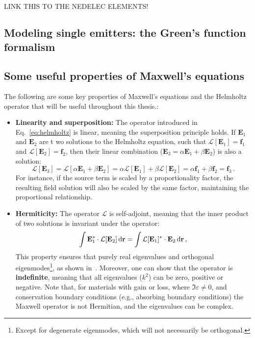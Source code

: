  LINK THIS TO THE NEDELEC ELEMENTS!

\subsection*{Modeling single emitters: the Green's function formalism}

\subsection*{Some useful properties of Maxwell's equations}
The following are some key properties of Maxwell's equations and the Helmholtz operator that will be useful throughout this thesis.:
\begin{itemize}
    \item \textbf{Linearity and superposition:} The operator introduced in Eq.~\eqref{eq:helmholtz} is linear, meaning the superposition principle holds. If $\mathbf{E}_1$ and $\mathbf{E}_2$ are t
    wo solutions to the Helmholtz equation, such that $\mathcal{L}[\mathbf{E}_1] = \mathbf{f}_1$ and 
    $\mathcal{L}[\mathbf{E}_2] = \mathbf{f}_2$, then their linear combination ($\mathbf{E}_3 = \alpha \mathbf{E}_1 + \beta \mathbf{E}_2$) 
    is also a solution:
    \begin{equation}
        \mathcal{L}[\mathbf{E}_3] = \mathcal{L}[\alpha \mathbf{E}_1 + \beta \mathbf{E}_2] = \alpha \mathcal{L}[\mathbf{E}_1] + \beta \mathcal{L}[\mathbf{E}_2] = \alpha \mathbf{f}_1 + \beta \mathbf{f}_2 = \mathbf{f}_3\,.
    \end{equation}
    For instance, if the source term is scaled by a proportionality factor, the resulting field solution will also be scaled by the same factor, maintaining the proportional relationship. 

    \item \textbf{Hermiticity:} The operator $\mathcal{L}$ is self-adjoint, meaning that the inner product of two solutions is invariant under the operator:
    \begin{equation}
        \int \mathbf{E}_1^* \cdot \mathcal{L}[\mathbf{E}_2] \mathop{}\!\text{d} \mathbf{r} = \int \mathcal{L}[\mathbf{E}_1]^* \cdot \mathbf{E}_2 \mathop{}\!\text{d} \mathbf{r}\,,
    \end{equation}
    This property ensures that purely real eigenvalues and orthogonal eigenmodes\footnote{Except for degenerate eigenmodes, which will not necessarily be orthogonal.}, as shown in~\cite{phot_crys}. Moreover,
    one can show that the operator is \textbf{indefinite}, meaning that all eigenvalues ($k^2$) can be zero, positive or negative. Note that, for materials with gain or loss, where $\Im{\varepsilon}\neq 0$, and conservation
    boundary conditions (e.g., absorbing boundary conditions) the Maxwell operator
    is not Hermitian, and the eigenvalues can be complex.
    

\end{itemize}
